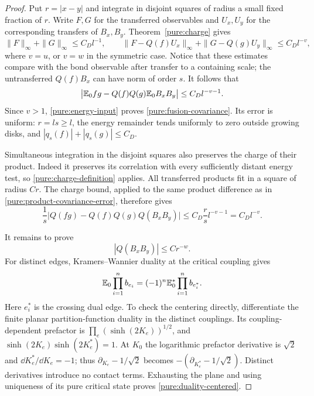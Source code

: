 \begin{proof}
Put $r=|x-y|$ and integrate in disjoint squares of radius a small fixed
fraction of $r$.  Write $F,G$ for the transferred observables and
$U_x,U_y$ for the corresponding transfers of $B_x,B_y$.
Theorem~\ref{pure:charge} gives
\[
 \|F\|_\infty+\|G\|_\infty\leq C_Dl^{-1},\qquad
 \|F-Q(f)U_x\|_\infty+\|G-Q(g)U_y\|_\infty
       \leq C_Dl^{-v},
\]
where $v=u$, or $v=w$ in the symmetric case.  Notice that these estimates
compare with the bond observable after transfer to a containing scale;
the untransferred $Q(f)B_x$ can have norm of order $s$.
It follows that
\begin{equation}
 \bigl|\mathbb E_0fg-Q(f)Q(g)\mathbb E_0B_xB_y\bigr|
       \leq C_Dl^{-v-1}.
 \label{pure:product-covariance-error}
\end{equation}
Since $v>1$, \eqref{pure:energy-input} proves
\eqref{pure:fusion-covariance}.  Its error is uniform: $r=ls\geq l$, the
energy remainder tends uniformly to zero outside growing disks, and
$|q_s(f)|+|q_s(g)|\leq C_D$.

Simultaneous integration in the disjoint squares also preserves the
charge of their product.  Indeed it preserves its correlation with every
sufficiently distant energy test, so \eqref{pure:charge-definition}
applies.  All transferred products fit in a square of radius $Cr$.
The charge bound, applied to the same product difference as in
\eqref{pure:product-covariance-error}, therefore gives
\begin{equation}
 \frac1s\bigl|Q(fg)-Q(f)Q(g)Q(B_xB_y)\bigr|
      \leq C_D\frac rs l^{-v-1}=C_Dl^{-v}.
 \label{pure:product-charge-error}
\end{equation}

It remains to prove
\begin{equation}
 |Q(B_xB_y)|\leq Cr^{-w}.
 \label{pure:bond-fusion}
\end{equation}
For distinct edges, Kramers--Wannier duality at the critical coupling gives
\begin{equation}
 \mathbb E_0\prod_{i=1}^n b_{e_i}
        =(-1)^n\mathbb E_0^*\prod_{i=1}^n b_{e_i^*}.
 \label{pure:duality-centered}
\end{equation}
Here $e_i^*$ is the crossing dual edge.  To check the centering directly,
differentiate the finite planar partition-function duality
\cite{KW} in the distinct couplings.  Its coupling-dependent prefactor is
$\prod_e(\sinh(2K_e))^{1/2}$, and
$\sinh(2K_e)\sinh(2K_e^*)=1$.  At $K_0$ the logarithmic prefactor
derivative is $\sqrt2$ and $\dd K_e^*/\dd K_e=-1$; thus
$\partial_{K_e}-1/\sqrt2$ becomes
$-(\partial_{K_e^*}-1/\sqrt2)$.  Distinct derivatives introduce no contact
terms.  Exhausting the plane and using uniqueness of its pure critical
state proves \eqref{pure:duality-centered}.


\end{proof}
